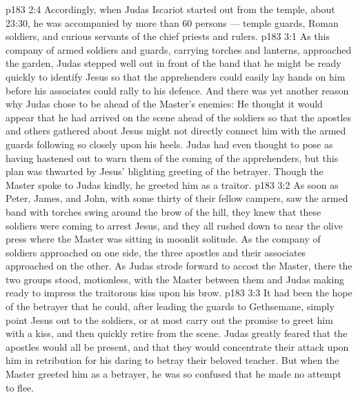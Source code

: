 \vs p183 2:4 Accordingly, when Judas Iscariot started out from the temple, about 23:30, he was accompanied by more than 60 persons --- temple guards, Roman soldiers, and curious servants of the chief priests and rulers.
\vs p183 3:1 As this company of armed soldiers and guards, carrying torches and lanterns, approached the garden, Judas stepped well out in front of the band that he might be ready quickly to identify Jesus so that the apprehenders could easily lay hands on him before his associates could rally to his defence. And there was yet another reason why Judas chose to be ahead of the Master’s enemies: He thought it would appear that he had arrived on the scene ahead of the soldiers so that the apostles and others gathered about Jesus might not directly connect him with the armed guards following so closely upon his heels. Judas had even thought to pose as having hastened out to warn them of the coming of the apprehenders, but this plan was thwarted by Jesus’ blighting greeting of the betrayer. Though the Master spoke to Judas kindly, he greeted him as a traitor.
\vs p183 3:2 As soon as Peter, James, and John, with some thirty of their fellow campers, saw the armed band with torches swing around the brow of the hill, they knew that these soldiers were coming to arrest Jesus, and they all rushed down to near the olive press where the Master was sitting in moonlit solitude. As the company of soldiers approached on one side, the three apostles and their associates approached on the other. As Judas strode forward to accost the Master, there the two groups stood, motionless, with the Master between them and Judas making ready to impress the traitorous kiss upon his brow.
\vs p183 3:3 It had been the hope of the betrayer that he could, after leading the guards to Gethsemane, simply point Jesus out to the soldiers, or at most carry out the promise to greet him with a kiss, and then quickly retire from the scene. Judas greatly feared that the apostles would all be present, and that they would concentrate their attack upon him in retribution for his daring to betray their beloved teacher. But when the Master greeted him as a betrayer, he was so confused that he made no attempt to flee.

